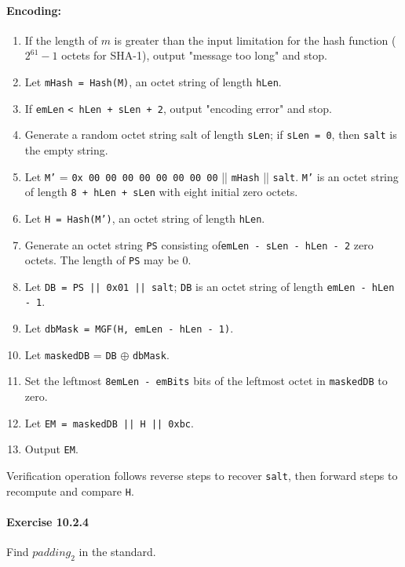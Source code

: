 \documentclass{article}
\begin{document}
	\paragraph{Encoding:}

	\begin{enumerate}
		\item If the length of $m$ is greater than the input limitation for the 
			hash function ($2^{61} - 1$ octets for SHA-1), output "message
			too long" and stop.
		\item Let \texttt{mHash = Hash(M)}, an octet string of length \texttt{hLen}.
		\item If \texttt{emLen} \texttt{< hLen + sLen + 2}, output "encoding error" 
			and stop.
		\item Generate a random octet string salt of length \texttt{sLen}; if
			\texttt{sLen = 0},
			then \texttt{salt} is the empty string.
		\item Let
			\texttt{M'} = \texttt{0x 00 00 00 00 00 00 00 00} || \texttt{mHash} || 
			\texttt{salt}.
			\texttt{M'} is an octet string of length \texttt{8 + hLen + sLen} with
			eight initial zero octets.
		\item Let \texttt{H = Hash(M')}, an octet string of length \texttt{hLen}.
		\item Generate an octet string \texttt{PS} consisting of\texttt{emLen - sLen - hLen - 2} 
			zero octets.  The length of \texttt{PS} may be 0.
		\item Let \texttt{DB = PS || 0x01 || salt}; \texttt{DB} is an octet string of length
			\texttt{emLen - hLen - 1}.
		\item Let \texttt{dbMask = MGF(H, emLen - hLen - 1)}.
		\item Let \texttt{maskedDB} = \texttt{DB} $\oplus$ \texttt{dbMask}.
		\item Set the leftmost \texttt{8emLen - emBits} bits of the leftmost octet in
			\texttt{maskedDB} to zero.
		\item Let \texttt{EM = maskedDB || H || 0xbc}.
		\item Output \texttt{EM}.
	\end{enumerate}

	 Verification operation follows reverse steps to recover \texttt{salt}, then forward 
	 steps to recompute and compare \texttt{H}. 

	\paragraph{Exercise 10.2.4}
	Find $padding_{2}$ in the standard.
\end{document}
